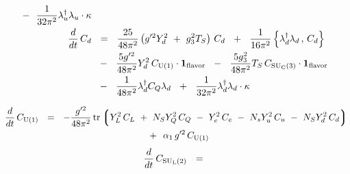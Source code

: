 \documentclass[12pt]{revtex4}
\newcommand{\suc}{{{\rm SU}_{\rm C}(3)}}
\newcommand{\sul}{{{\rm SU}_{\rm L}(2)}}
\newcommand{\ue}{{{\rm U}(1)}}
\newcommand{\uflavor}{\mathbf{1}_{\rm flavor}}
\newcommand{\lgr}{\left\lgroup}
\newcommand{\rgr}{\right\rgroup}
\begin{document}
\begin{align}
	~~-~~
	\frac{1}{32\pi^2}
	\lambda_u^\dag \lambda_u \cdot
	\kappa
	\\
\notag
	\frac{d}{dt}\, 
	C_d
	&
	~~=~~
	\frac{25}{48\pi^2} 
	\left( g'^2 Y_d^2 ~+~ g_3^2 T_S 
	\right)\, C_d
	~~+~~
	\frac{1}{16\pi^2} 
	\left\{ \lambda_d^\dag \lambda_d \,,\, C_d 
	\right\}
	\\
\notag
	&
	~~-~~
	\frac{5 g'^2}{48\pi^2} Y_d^2 \, C_\ue \cdot \uflavor
	~~-~~
	\frac{5 g_3^2}{48\pi^2} T_S \, C_\suc \cdot \uflavor
	\\
\notag
	&
	~~-~~
	\frac{1}{48\pi^2} \lambda_d^\dag C_Q \lambda_d 
	~~+~~
	\frac{1}{32\pi^2} \lambda_d^\dag \lambda_d \cdot
	\kappa
\end{align}

\begin{multline}
\notag
	\frac{d}{dt}\, 
	C_\ue 
	~~=~~
	- \frac{g'^2}{48\pi^2}\,
	{\rm tr} 
	\lgr
		Y_L^2\, C_L ~+~ N_S Y_Q^2\, C_Q ~-~
		Y_e^2\, C_e ~-~ 
		N_s Y_u^2\, C_u ~-~ N_S Y_d^2\, C_d
	\rgr
	\\
	~~+~~
	\alpha_1 \, g'^2 \, C_\ue
\end{multline}
\begin{equation*}
	\frac{d}{dt}\, 
	C_\sul 
	~~=~~
	
\end{equation*}

\end{document}
